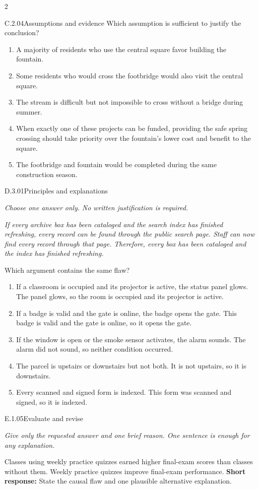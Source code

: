 \documentclass[9pt]{extarticle}
\newcommand{\choice}[1]{\item #1}
\begin{document}
\begin{multicols}{2}
\begin{DenseCoreProblem}{C.2.04}{Assumptions and evidence}
Which assumption is sufficient to justify the conclusion?
\begin{enumerate}[label=(\alph*)]
  \choice{A majority of residents who use the central square favor building the fountain.}
  \choice{Some residents who would cross the footbridge would also visit the central square.}
  \choice{The stream is difficult but not impossible to cross without a bridge during summer.}
  \choice{When exactly one of these projects can be funded, providing the safe spring crossing should take priority over the fountain's lower cost and benefit to the square.}
  \choice{The footbridge and fountain would be completed during the same construction season.}
\end{enumerate}
\end{DenseCoreProblem}
\begin{DenseCoreProblem}{D.3.01}{Principles and explanations}
{\scriptsize\textit{Choose one answer only. No written justification is required.}\par}
\emph{If every archive box has been cataloged and the search index has finished refreshing, every record can be found through the public search page. Staff can now find every record through that page. Therefore, every box has been cataloged and the index has finished refreshing.}

Which argument contains the same flaw?
\begin{enumerate}[label=(\alph*)]
  \choice{If a classroom is occupied and its projector is active, the status panel glows. The panel glows, so the room is occupied and its projector is active.}
  \choice{If a badge is valid and the gate is online, the badge opens the gate. This badge is valid and the gate is online, so it opens the gate.}
  \choice{If the window is open or the smoke sensor activates, the alarm sounds. The alarm did not sound, so neither condition occurred.}
  \choice{The parcel is upstairs or downstairs but not both. It is not upstairs, so it is downstairs.}
  \choice{Every scanned and signed form is indexed. This form was scanned and signed, so it is indexed.}
\end{enumerate}
\end{DenseCoreProblem}
\begin{DenseCoreProblem}{E.1.05}{Evaluate and revise}
{\scriptsize\textit{Give only the requested answer and one brief reason. One sentence is enough for any explanation.}\par}
Classes using weekly practice quizzes earned higher final-exam scores than classes without them. Weekly practice quizzes improve final-exam performance.
\textbf{Short response:} State the causal flaw and one plausible alternative explanation.
\end{DenseCoreProblem}
\end{multicols}
\end{document}
